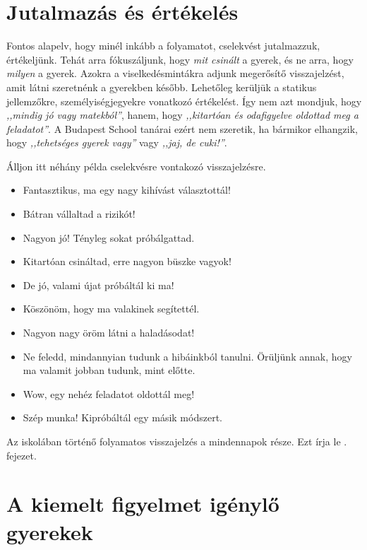\section{Jutalmazás és értékelés}
\label{jutalmazas}

Fontos alapelv, hogy minél inkább a folyamatot, cselekvést jutalmazzuk, értékeljünk. Tehát arra fókuszáljunk, hogy
 \emph{mit csinált} a gyerek, és ne arra, hogy \emph{milyen} a gyerek. Azokra
a viselkedésmintákra adjunk megerősítő visszajelzést, amit látni szeretnénk a gyerekben később. 
Lehetőleg kerüljük a statikus jellemzőkre, személyiségjegyekre vonatkozó értékelést. Így nem azt mondjuk, hogy
\emph{,,mindig jó vagy matekból''}, hanem, hogy \emph{,,kitartóan és odafigyelve oldottad meg a feladatot''}. A Budapest School tanárai
ezért nem szeretik, ha bármikor elhangzik, hogy \emph{,,tehetséges gyerek vagy''} vagy \emph{,,jaj, de cuki!''}. 

Álljon itt néhány példa cselekvésre vontakozó visszajelzésre. 

\begin{itemize}

      \item
            Fantasztikus, ma egy nagy kihívást választottál!
      \item
            Bátran vállaltad a rizikót!
      \item
            Nagyon jó! Tényleg sokat próbálgattad.
      \item
            Kitartóan csináltad, erre nagyon büszke vagyok!
      \item
            De jó, valami újat próbáltál ki ma!
      \item
            Köszönöm, hogy ma valakinek segítettél.
      \item
            Nagyon nagy öröm látni a haladásodat!
      \item
            Ne feledd, mindannyian tudunk a hibáinkból tanulni. Örüljünk annak,
            hogy ma valamit jobban tudunk, mint előtte.
      \item
            Wow, egy nehéz feladatot oldottál meg!
      \item
            Szép munka! Kipróbáltál egy másik módszert.
\end{itemize}

Az iskolában történő folyamatos visszajelzés a mindennapok része. Ezt írja le . fejezet. 



\section{A kiemelt figyelmet igénylő
  gyerekek}\label{sec:kiemelt_figyelem}


